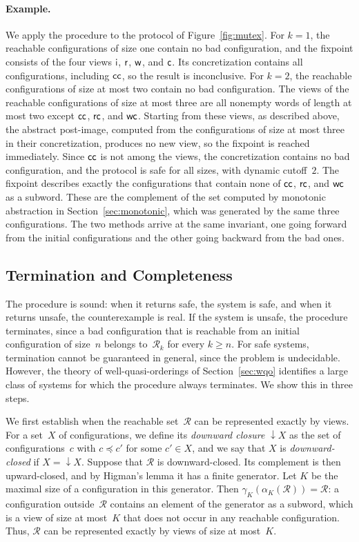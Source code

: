 \paragraph{Example.}
We apply the procedure to the protocol of Figure~\ref{fig:mutex}. For $k = 1$,
the reachable configurations of size one contain no bad configuration, and the
fixpoint consists of the four views $\mathsf{i}$, $\mathsf{r}$, $\mathsf{w}$, and $\mathsf{c}$. Its
concretization contains all configurations, including $\mathsf{c}\mathsf{c}$, so the
result is inconclusive. For $k = 2$, the reachable configurations of size at
most two contain no bad configuration. The views of the reachable
configurations of size at most three are all nonempty words of length at most
two except $\mathsf{c}\mathsf{c}$, $\mathsf{r}\mathsf{c}$, and $\mathsf{w}\mathsf{c}$. Starting from these
views, as described above, the abstract post-image, computed from the
configurations of size at most three in their concretization, produces no new
view, so the fixpoint is reached immediately. Since $\mathsf{c}\mathsf{c}$ is not among the views, the
concretization contains no bad configuration, and the protocol is safe for all
sizes, with dynamic cutoff~$2$. The fixpoint describes exactly the
configurations that contain none of $\mathsf{c}\mathsf{c}$, $\mathsf{r}\mathsf{c}$, and $\mathsf{w}\mathsf{c}$
as a subword. These are the complement of the set computed by monotonic
abstraction in Section~\ref{sec:monotonic}, which was generated by the same
three configurations. The two methods arrive at the same invariant, one going
forward from the initial configurations and the other going backward from the
bad ones.

\subsection{Termination and Completeness}

The procedure is sound: when it returns safe, the system is safe, and when it
returns unsafe, the counterexample is real. If the system is unsafe, the
procedure terminates, since a bad configuration that is reachable from an
initial configuration of size~$n$ belongs to~$\mathcal{R}_k$ for every
$k \geq n$. For safe systems, termination cannot be guaranteed in general,
since the problem is undecidable. However, the theory of well-quasi-orderings
of Section~\ref{sec:wqo} identifies a large class of systems for which the
procedure always terminates. We show this in three steps.

We first establish when the reachable set~$\mathcal{R}$ can be represented
exactly by views. For a set~$X$ of configurations, we define its
\emph{downward closure} ${\downarrow}X$ as the set of configurations~$c$
with $c \preceq c'$ for some $c' \in X$, and we say that $X$ is
\emph{downward-closed} if $X = {\downarrow}X$.
Suppose that $\mathcal{R}$ is downward-closed. Its complement is then
upward-closed, and by Higman's lemma it has a finite generator. Let $K$ be the
maximal size of a configuration in this generator. Then
$\gamma_K(\alpha_K(\mathcal{R})) = \mathcal{R}$: a configuration
outside~$\mathcal{R}$ contains an element of the generator as a subword,
which is a view of size at most~$K$ that does not occur in any reachable
configuration. Thus, $\mathcal{R}$ can be represented exactly by views of
size at most~$K$.

